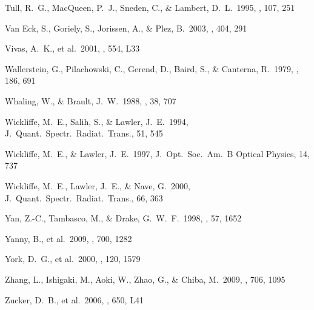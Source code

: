 \documentclass{emulateapj}
\begin{document}
\begin{thebibliography}{}
 Tull, R.~G., MacQueen, 
P.~J., Sneden, C., \& Lambert, D.~L.\ 1995, \pasp, 107, 251 

 Van Eck, S., Goriely, S., 
Jorissen, A., \& Plez, B.\ 2003, \aap, 404, 291 

 Vivas, A.~K., et al.\ 
2001, \apjl, 554, L33 

 Wallerstein, G., 
Pilachowski, C., Gerend, D., Baird, S., 
\& Canterna, R.\ 1979, \mnras, 186, 691 

 Whaling, W., \& Brault, J.~W.\ 
1988, \physscr, 38, 707 

 Wickliffe, M.~E., 
Salih, S., \& Lawler, J.~E.\ 1994, J.\ Quant.\ Spectr.\ Radiat.\ Trans., 
51, 545 

 Wickliffe, M.~E., \& 
Lawler, J.~E.\ 1997, J.\ Opt.\ Soc.\ Am.\ B Optical Physics, 14, 737 

\bibitem[Wickliffe et al.(2000)]{wickliffe00} Wickliffe, M.~E., 
Lawler, J.~E., \& Nave, G.\ 2000, J.\ Quant.\ Spectr.\ Radiat.\ Trans., 
66, 363 

 Yan, Z.-C., Tambasco, M., 
\& Drake, G.~W.~F.\ 1998, \pra, 57, 1652 

 Yanny, B., et al.\ 2009, 
\apj, 700, 1282 

 York, D.~G., et al.\ 2000, 
\aj, 120, 1579 

 Zhang, L., Ishigaki, M., 
Aoki, W., Zhao, G., \& Chiba, M.\ 2009, \apj, 706, 1095

 Zucker, D.~B., et al.\ 
2006, \apjl, 650, L41 


\end{thebibliography}



\clearpage





\clearpage



\clearpage

%






\clearpage



\clearpage



\clearpage



\clearpage



\clearpage

\end{document}
